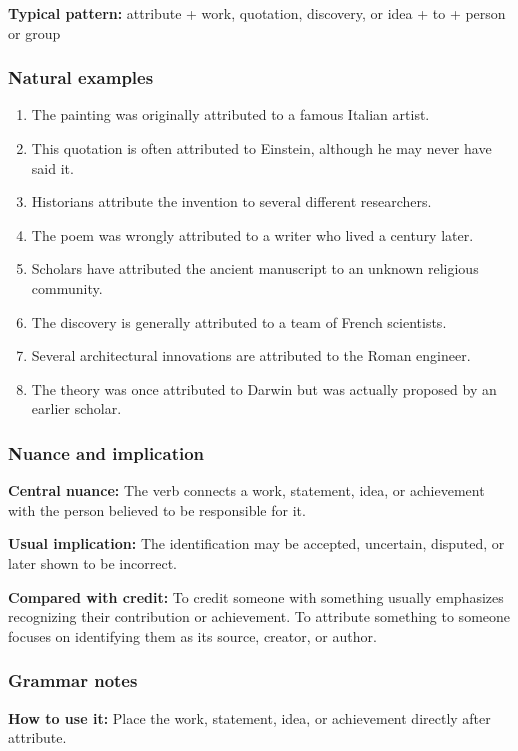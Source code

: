 \documentclass[11pt]{article}
\begin{document}
\textbf{Typical pattern:} attribute + work, quotation, discovery, or idea + to + person or group

\subsubsection{Natural examples}
\begin{enumerate}
  \item The painting was originally attributed to a famous Italian artist.
  \item This quotation is often attributed to Einstein, although he may never have said it.
  \item Historians attribute the invention to several different researchers.
  \item The poem was wrongly attributed to a writer who lived a century later.
  \item Scholars have attributed the ancient manuscript to an unknown religious community.
  \item The discovery is generally attributed to a team of French scientists.
  \item Several architectural innovations are attributed to the Roman engineer.
  \item The theory was once attributed to Darwin but was actually proposed by an earlier scholar.
\end{enumerate}

\subsubsection{Nuance and implication}
\textbf{Central nuance:} The verb connects a work, statement, idea, or achievement with the person believed to be responsible for it.

\textbf{Usual implication:} The identification may be accepted, uncertain, disputed, or later shown to be incorrect.

\textbf{Compared with credit:} To credit someone with something usually emphasizes recognizing their contribution or achievement. To attribute something to someone focuses on identifying them as its source, creator, or author.

\subsubsection{Grammar notes}
\textbf{How to use it:} Place the work, statement, idea, or achievement directly after attribute.
\end{document}
